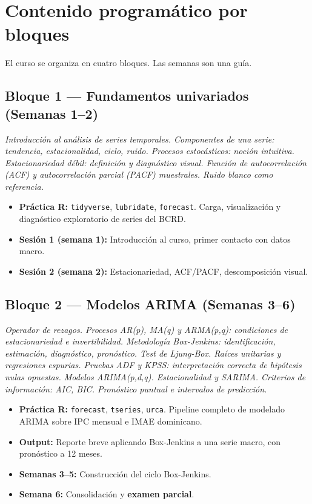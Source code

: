 \documentclass[11pt,letterpaper]{article}
\begin{document}
\section{Contenido programático por bloques}

El curso se organiza en cuatro bloques. Las semanas son una guía.

\subsection*{Bloque 1 --- Fundamentos univariados (Semanas 1--2)}

\emph{Introducción al análisis de series temporales. Componentes de una serie: tendencia, estacionalidad, ciclo, ruido. Procesos estocásticos: noción intuitiva. Estacionariedad débil: definición y diagnóstico visual. Función de autocorrelación (ACF) y autocorrelación parcial (PACF) muestrales. Ruido blanco como referencia.}

\begin{itemize}[leftmargin=*, itemsep=0.2em]
  \item \textbf{Práctica R:} \texttt{tidyverse}, \texttt{lubridate}, \texttt{forecast}. Carga, visualización y diagnóstico exploratorio de series del BCRD.
  \item \textbf{Sesión 1 (semana 1):} Introducción al curso, primer contacto con datos macro.
  \item \textbf{Sesión 2 (semana 2):} Estacionariedad, ACF/PACF, descomposición visual.
\end{itemize}

\subsection*{Bloque 2 --- Modelos ARIMA (Semanas 3--6)}

\emph{Operador de rezagos. Procesos AR(p), MA(q) y ARMA(p,q): condiciones de estacionariedad e invertibilidad. Metodología Box-Jenkins: identificación, estimación, diagnóstico, pronóstico. Test de Ljung-Box. Raíces unitarias y regresiones espurias. Pruebas ADF y KPSS: interpretación correcta de hipótesis nulas opuestas. Modelos ARIMA(p,d,q). Estacionalidad y SARIMA. Criterios de información: AIC, BIC. Pronóstico puntual e intervalos de predicción.}

\begin{itemize}[leftmargin=*, itemsep=0.2em]
  \item \textbf{Práctica R:} \texttt{forecast}, \texttt{tseries}, \texttt{urca}. Pipeline completo de modelado ARIMA sobre IPC mensual e IMAE dominicano.
  \item \textbf{Output:} Reporte breve aplicando Box-Jenkins a una serie macro, con pronóstico a 12 meses.
  \item \textbf{Semanas 3--5:} Construcción del ciclo Box-Jenkins.
  \item \textbf{Semana 6:} Consolidación y \textbf{examen parcial}.
\end{itemize}
\end{document}

